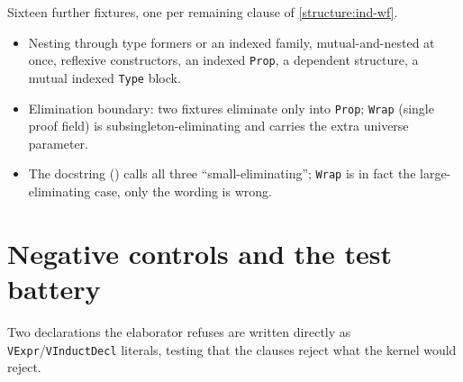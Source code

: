 \begin{example}
  \label{def:iotashape-fixtures-nested}
  \leanok

   Sixteen further fixtures, one per remaining clause of \ref{structure:ind-wf}.
  \begin{itemize}
  \item Nesting through type formers or an indexed family, mutual-and-nested at once, reflexive
        constructors, an indexed \texttt{Prop}, a dependent structure, a mutual indexed
        \texttt{Type} block.
  \item Elimination boundary: two fixtures eliminate only into \texttt{Prop}; \texttt{Wrap}
        (single proof field) is subsingleton-eliminating and carries the extra universe parameter.
  \item {} The docstring () calls all three
        ``small-eliminating''; \texttt{Wrap} is in fact the large-eliminating case, only the
        wording is wrong.
  \end{itemize}
\end{example}

\section{Negative controls and the test battery}

Two declarations the elaborator refuses are written directly as \texttt{VExpr}/\texttt{VInductDecl}
literals, testing that the clauses reject what the kernel would reject.

